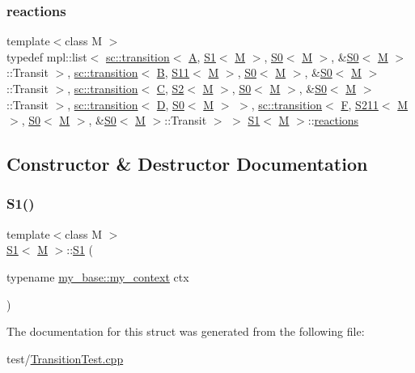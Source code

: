 \subsubsection{\texorpdfstring{reactions}{reactions}}
{\footnotesize\ttfamily template$<$class M $>$ \\
typedef mpl\+::list$<$ \mbox{\hyperlink{classboost_1_1statechart_1_1transition}{sc\+::transition}}$<$ \mbox{\hyperlink{struct_a}{A}}, \mbox{\hyperlink{struct_s1}{S1}}$<$ \mbox{\hyperlink{struct_m}{M}} $>$, \mbox{\hyperlink{struct_s0}{S0}}$<$ \mbox{\hyperlink{struct_m}{M}} $>$, \&\mbox{\hyperlink{struct_s0}{S0}}$<$ \mbox{\hyperlink{struct_m}{M}} $>$\+::Transit $>$, \mbox{\hyperlink{classboost_1_1statechart_1_1transition}{sc\+::transition}}$<$ \mbox{\hyperlink{struct_b}{B}}, \mbox{\hyperlink{struct_s11}{S11}}$<$ \mbox{\hyperlink{struct_m}{M}} $>$, \mbox{\hyperlink{struct_s0}{S0}}$<$ \mbox{\hyperlink{struct_m}{M}} $>$, \&\mbox{\hyperlink{struct_s0}{S0}}$<$ \mbox{\hyperlink{struct_m}{M}} $>$\+::Transit $>$, \mbox{\hyperlink{classboost_1_1statechart_1_1transition}{sc\+::transition}}$<$ \mbox{\hyperlink{struct_c}{C}}, \mbox{\hyperlink{struct_s2}{S2}}$<$ \mbox{\hyperlink{struct_m}{M}} $>$, \mbox{\hyperlink{struct_s0}{S0}}$<$ \mbox{\hyperlink{struct_m}{M}} $>$, \&\mbox{\hyperlink{struct_s0}{S0}}$<$ \mbox{\hyperlink{struct_m}{M}} $>$\+::Transit $>$, \mbox{\hyperlink{classboost_1_1statechart_1_1transition}{sc\+::transition}}$<$ \mbox{\hyperlink{struct_d}{D}}, \mbox{\hyperlink{struct_s0}{S0}}$<$ \mbox{\hyperlink{struct_m}{M}} $>$ $>$, \mbox{\hyperlink{classboost_1_1statechart_1_1transition}{sc\+::transition}}$<$ \mbox{\hyperlink{struct_f}{F}}, \mbox{\hyperlink{struct_s211}{S211}}$<$ \mbox{\hyperlink{struct_m}{M}} $>$, \mbox{\hyperlink{struct_s0}{S0}}$<$ \mbox{\hyperlink{struct_m}{M}} $>$, \&\mbox{\hyperlink{struct_s0}{S0}}$<$ \mbox{\hyperlink{struct_m}{M}} $>$\+::Transit $>$ $>$ \mbox{\hyperlink{struct_s1}{S1}}$<$ \mbox{\hyperlink{struct_m}{M}} $>$\+::\mbox{\hyperlink{struct_s1_a3da743f3095f20881e0a197c37f7f91f}{reactions}}}



\subsection{Constructor \& Destructor Documentation}
\mbox{\label{struct_s1_a399131152a6789765e00223c36791861}} 
\subsubsection{\texorpdfstring{S1()}{S1()}}
{\footnotesize\ttfamily template$<$class M $>$ \\
\mbox{\hyperlink{struct_s1}{S1}}$<$ \mbox{\hyperlink{struct_m}{M}} $>$\+::\mbox{\hyperlink{struct_s1}{S1}} (\begin{DoxyParamCaption}\item[{typename \mbox{\hyperlink{struct_orthogonal1_a8cee9db1dad468ee5f8e34871d7a4ae2}{my\+\_\+base\+::my\+\_\+context}}}]{ctx }\end{DoxyParamCaption})\hspace{0.3cm}{\ttfamily [inline]}}



The documentation for this struct was generated from the following file\+:\begin{DoxyCompactItemize}
\item 
test/\mbox{\hyperlink{_transition_test_8cpp}{Transition\+Test.\+cpp}}\end{DoxyCompactItemize}
